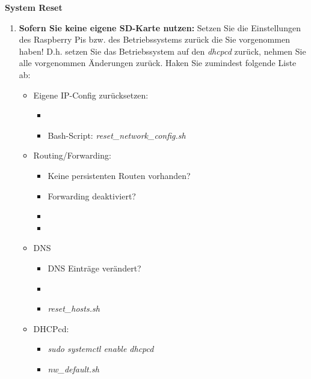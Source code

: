 \documentclass[paper=a4,fontsize=11pt]{scrartcl}%
\numberwithin{equation}{section}
\begin{document}
\begin{center}\Large{\textbf{System Reset}}\end{center}\vskip0.25in
\begin{enumerate}
	\item \textbf{Sofern Sie keine eigene SD-Karte nutzen:} Setzen Sie die Einstellungen des Raspberry Pis bzw. des Betriebssystems zurück die Sie vorgenommen haben! D.h. setzen Sie das Betriebssystem auf den \emph{dhcpcd} zurück, nehmen Sie alle vorgenommen Änderungen zurück. Haken Sie zumindest folgende Liste ab:
\begin{itemize}
	\item Eigene IP-Config zurücksetzen:
	\begin{itemize}
		\item {}
		\item Bash-Script: \emph{reset\_network\_config.sh}
	\end{itemize}
	\item Routing/Forwarding:
	\begin{itemize}
		\item Keine persistenten Routen vorhanden?
		\item Forwarding deaktiviert? 
		\item {}
		\item {}
	\end{itemize}
	\item DNS
	\begin{itemize}
		\item DNS Einträge verändert?
		\item {}
		\item \emph{reset\_hosts.sh}
	\end{itemize}
	\item DHCPcd:
	\begin{itemize}
		\item \emph{sudo systemctl enable dhcpcd}
		\item \emph{nw\_default.sh}
	\end{itemize}
\end{itemize}
\end{enumerate}
\end{document}
